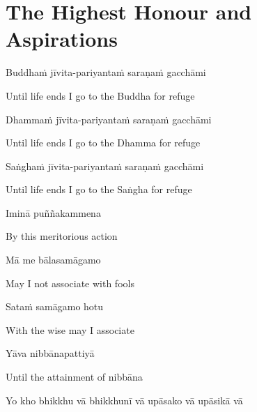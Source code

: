 

\section{The Highest Honour and Aspirations}
\label{highest-honour-aspirations}

\begin{leader}
\end{leader}

Buddhaṁ jīvita-pariyantaṁ saraṇaṁ gacchāmi

\begin{english}
  Until life ends I go to the Buddha for refuge
\end{english}

Dhammaṁ jīvita-pariyantaṁ saraṇaṁ gacchāmi

\begin{english}
  Until life ends I go to the Dhamma for refuge
\end{english}

Saṅghaṁ jīvita-pariyantaṁ saraṇaṁ gacchāmi

\begin{english}
  Until life ends I go to the Saṅgha for refuge
\end{english}

Iminā puññakammena

\begin{english}
  By this meritorious action
\end{english}

Mā me bālasamāgamo

\begin{english}
  May I not associate with fools
\end{english}

Sataṁ samāgamo hotu

\begin{english}
  With the wise may I associate
\end{english}

Yāva nibbānapattiyā

\begin{english}
  Until the attainment of nibbāna
\end{english}


Yo kho bhikkhu vā bhikkhunī vā upāsako vā upāsikā vā

